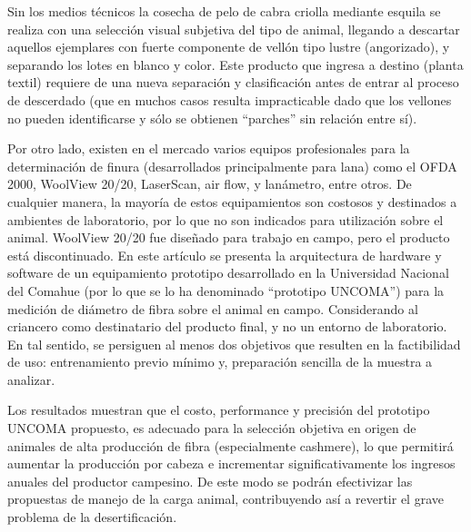 \documentclass[runningheads,a4paper]{llncs}
\begin{document}
Sin los medios técnicos la cosecha de pelo de cabra criolla mediante esquila se realiza con una selección visual subjetiva del tipo de animal, llegando a descartar aquellos ejemplares con fuerte componente de vellón tipo lustre (angorizado), y separando los lotes en blanco y color. Este producto que ingresa a destino (planta textil) requiere de una nueva separación y clasificación antes de entrar al proceso de descerdado (que en muchos casos resulta impracticable dado que los vellones no pueden identificarse y sólo se obtienen “parches” sin relación entre sí).

Por otro lado, existen en el mercado varios equipos profesionales para la determinación de finura (desarrollados principalmente para lana) como el OFDA 2000, WoolView 20/20, LaserScan, air flow, y lanámetro, entre otros. De cualquier manera, la mayoría de estos equipamientos son costosos y destinados a ambientes de laboratorio, por lo que no son indicados para utilización sobre el animal. WoolView 20/20 fue diseñado para trabajo en campo, pero el producto está discontinuado.
En este artículo se presenta la arquitectura de hardware y software de un equipamiento prototipo desarrollado en la Universidad Nacional del Comahue (por lo que se lo ha denominado ``prototipo UNCOMA'') para la medición de diámetro de fibra sobre el animal en campo. Considerando al criancero como destinatario del 
producto final, y no un entorno de laboratorio. En tal sentido, se persiguen al menos dos objetivos que 
resulten en la factibilidad de uso: entrenamiento previo mínimo y, preparación sencilla de la muestra a 
analizar.  
 
Los resultados muestran que el costo, performance y precisión del prototipo UNCOMA propuesto, es adecuado para la selección objetiva en origen de animales de alta producción de fibra (especialmente cashmere), lo que permitirá aumentar la producción por cabeza e incrementar significativamente los ingresos anuales del productor campesino. De este modo se podrán efectivizar las propuestas de manejo de la carga animal, contribuyendo así a revertir el grave problema de la desertificación.

%
\end{document}
